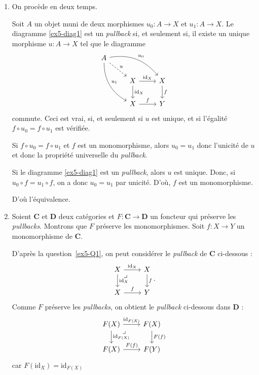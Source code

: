 \documentclass{../../td}
\newcommand\pullback{\arrow[very near start,description,phantom]{dr}{\lrcorner}}
\begin{document}
  \begin{enumerate}
    \item On procède en deux temps.\label{ex5-Q1}

      Soit $A$ un objet muni de deux morphismes $u_0 : A \to X$ et $u_1 : A \to X$.
      Le diagramme \ref{ex5-diag1} est un \textit{pullback} si, et seulement si, il existe un unique morphisme $u : A \to X$ tel que le diagramme \[
      \begin{tikzcd}
        A \arrow[bend left]{drr}{u_0} \arrow[bend right]{ddr}{u_1} \arrow[dashed]{dr}{u}\\
        & X \arrow{r}{\mathrm{id}_X} \arrow{d}{\mathrm{id}_X} & X\arrow{d}{f}\\
        & X \arrow{r}{f} & Y
      \end{tikzcd}
      \]
      commute.
      Ceci est vrai, si, et seulement si $u$ est unique, et si l'égalité $f \circ u_0 = f \circ u_1$ est vérifiée.

      Si $f \circ u_0 = f\circ u_1$ et $f$ est un monomorphisme, alors $u_0 = u_1$ donc l'unicité de $u$ et donc la propriété universelle du \textit{pullback}.

      Si le diagramme \ref{ex5-diag1} est un \textit{pullback}, alors $u$ est unique. Donc, si $u_0 \circ f = u_1 \circ f$, on a donc $u_0 = u_1$ par unicité.
      D'où, $f$ est un monomorphisme.

      D'où l'équivalence.
    \item Soient $\mathbf{C}$ et $\mathbf{D}$ deux catégories et $F : \mathbf{C} \to \mathbf{D}$ un foncteur qui préserve les \textit{pullbacks}.
      Montrons que $F$ préserve les monomorphismes.
      Soit $f : X \to Y$ un monomorphisme de $\mathbf{C}$.

      D'après la question~\ref{ex5-Q1}, on peut considérer le \textit{pullback} de $\mathbf{C}$ ci-dessous :
      \[
        \begin{tikzcd}
          X \arrow{r}{\mathrm{id}_X} \arrow{d}{\mathrm{id}_X}\pullback & X\arrow{d}{f}\\
          X \arrow{r}{f} & Y
        \end{tikzcd}
      .\] 
      Comme $F$ préserve les \textit{pullbacks}, on obtient le \textit{pullback} ci-dessous dans $\mathbf{D}$ :
      \[
        \begin{tikzcd}
          F(X) \arrow{r}{\mathrm{id}_{F(X)}} \arrow{d}{\mathrm{id}_{F(X)}}\pullback & F(X)\arrow{d}{F(f)}\\
          F(X) \arrow{r}{F(f)} & F(Y)
        \end{tikzcd}
      \]
      car $F(\mathrm{id}_X) = \mathrm{id}_{F(X)}$


\end{enumerate}
\end{document}
